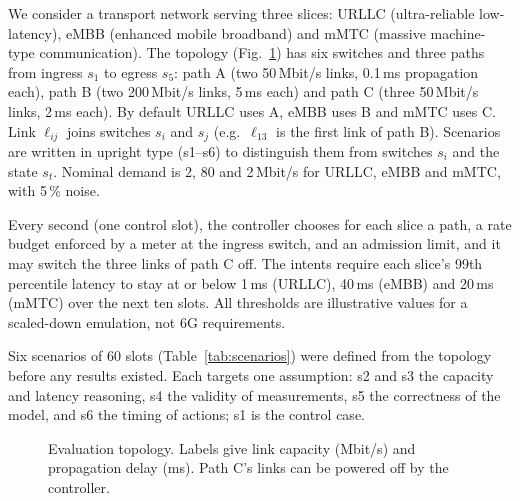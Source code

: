 \documentclass[conference]{IEEEtran}
\begin{document}
We consider a transport network serving three slices: URLLC (ultra-reliable
low-latency), eMBB (enhanced mobile broadband) and mMTC (massive machine-type
communication). The topology (Fig.~\ref{fig:topology}) has six switches and three
paths from ingress $s_1$ to egress $s_5$: path A (two 50\,Mbit/s links, 0.1\,ms
propagation each), path B (two 200\,Mbit/s links, 5\,ms each) and path C (three
50\,Mbit/s links, 2\,ms each). By default URLLC uses A, eMBB uses B and mMTC uses C. Link $\ell_{ij}$ joins switches
$s_i$ and $s_j$ (e.g.\ $\ell_{13}$ is the first link of path B). Scenarios are
written in upright type (s1--s6) to distinguish them from switches $s_i$ and the
state $s_t$.
Nominal demand is 2, 80 and 2\,Mbit/s for URLLC, eMBB and mMTC, with 5\,\% noise.

Every second (one control slot), the controller chooses for each slice a path, a
rate budget enforced by a meter at the ingress switch, and an admission limit, and it
may switch the three links of path C off. The intents require each slice's 99th
percentile latency to stay at or below 1\,ms (URLLC), 40\,ms (eMBB) and 20\,ms
(mMTC) over the next ten slots. All thresholds are illustrative values for a
scaled-down emulation, not 6G requirements.

Six scenarios of 60 slots (Table~\ref{tab:scenarios}) were defined from the topology
before any results existed. Each targets one assumption: s2 and s3 the capacity and
latency reasoning, s4 the validity of measurements, s5 the correctness of the model,
and s6 the timing of actions; s1 is the control case.

\begin{figure}[t]
\centering
{}
\caption{Evaluation topology. Labels give link capacity (Mbit/s) and propagation
delay (ms). Path C's links can be powered off by the controller.}
\label{fig:topology}
\end{figure}
\end{document}
